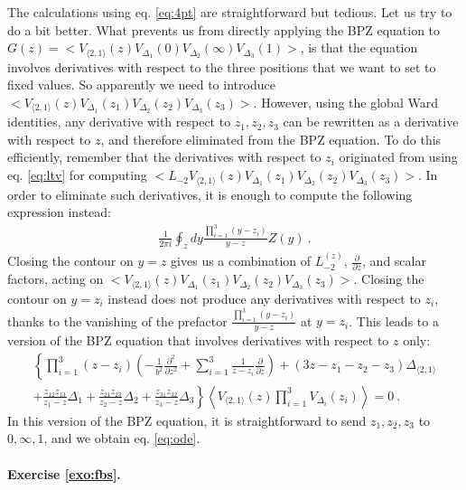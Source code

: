\documentclass[12pt, a4paper]{article}
\theoremstyle{break}
\begin{document}
The calculations using eq. \eqref{eq:4pt} are straightforward but tedious. Let us try to do a bit better. What prevents us from directly applying the BPZ equation to $G(z)=\Big< V_{\langle 2, 1 \rangle}(z) V_{\Delta_1}(0)V_{\Delta_2}(\infty)V_{\Delta_3}(1) \Big>$, is that the equation involves derivatives with respect to the three positions that we want to set to fixed values. So apparently we need to introduce $\Big< V_{\langle 2, 1 \rangle}(z) V_{\Delta_1}(z_1)V_{\Delta_2}(z_2)V_{\Delta_3}(z_3) \Big>$. 
However, using the global Ward identities, any derivative with respect to $z_1,z_2,z_3$ can be rewritten as a derivative with respect to $z$, and therefore eliminated from the BPZ equation. To do this efficiently, remember that the derivatives with respect to $z_i$ originated from using eq. \eqref{eq:ltv} for computing $\Big< L_{-2}V_{\langle 2, 1 \rangle}(z) V_{\Delta_1}(z_1)V_{\Delta_2}(z_2)V_{\Delta_3}(z_3) \Big>$. In order to eliminate such derivatives, it is enough to compute the following expression instead:
\begin{align}
 \frac{1}{2\pi i}\oint_{z} dy\frac{\prod_{i=1}^3(y-z_i)}{y-z} Z(y) \ .
\end{align}
Closing the contour on $y=z$ gives us a combination of $L_{-2}^{(z)}$, $\frac{\partial}{\partial z}$, and scalar factors, acting on  $\Big< V_{\langle 2, 1 \rangle}(z) V_{\Delta_1}(z_1)V_{\Delta_2}(z_2)V_{\Delta_3}(z_3) \Big>$. Closing the contour on $y=z_i$ instead does not produce any derivatives with respect to $z_i$, thanks to the vanishing of the prefactor $\frac{\prod_{i=1}^3(y-z_i)}{y-z}$ at $y=z_i$. This leads to a version of the BPZ equation that involves derivatives with respect to $z$ only:
\begin{multline}
  \left\{ \prod_{i=1}^3(z-z_i)\left(-\frac{1}{b^2}\frac{\partial^2}{\partial z^2} +\sum_{i=1}^3 \frac{1}{z-z_i} {\frac{\partial}{\partial z}} \right) + (3z-z_1-z_2-z_3)\Delta_{\langle 2,1 \rangle} \right.
  \\
\left.  +\frac{z_{12}z_{13}}{z_1-z}\Delta_1 + \frac{z_{21}z_{23}}{z_2-z}\Delta_2+\frac{z_{31}z_{32}}{z_3-z}\Delta_3\right\} 
\left\langle V_{\langle 2,1 \rangle}(z)\prod_{i=1}^3 V_{\Delta_i}(z_i)\right\rangle  = 0\ .
\label{uode}
\end{multline}
In this version of the BPZ equation, it is straightforward to send $z_1,z_2,z_3$ to $0,\infty, 1$, and we obtain eq. \eqref{eq:ode}.

\paragraph{Exercise \ref{exo:fbs}.}
\end{document}

